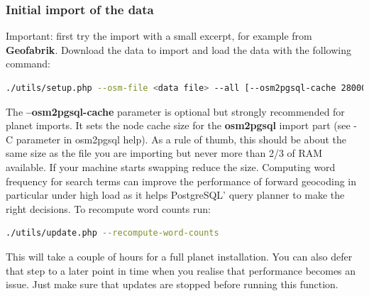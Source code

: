 \documentclass[12pt]{article}
\begin{document}
\subsubsection{Initial import of the data}
Important: first try the import with a small excerpt, for example from \textbf{Geofabrik}.
Download the data to import and load the data with the following command:
\begin{lstlisting}[language=bash,breaklines=true]
./utils/setup.php --osm-file <data file> --all [--osm2pgsql-cache 28000] 2>&1 | tee setup.log
\end{lstlisting}
The \textbf{--osm2pgsql-cache} parameter is optional but strongly recommended for planet imports. It
sets the node cache size for the \textbf{osm2pgsql} import part (see -C parameter in osm2pgsql help).
As a rule of thumb, this should be about the same size as the file you are importing but never
more than 2/3 of RAM available. If your machine starts swapping reduce the size.
Computing word frequency for search terms can improve the performance of forward geocoding
in particular under high load as it helps PostgreSQL' query planner to make the right decisions. To
recompute word counts run:
\begin{lstlisting}[language=bash,breaklines=true]
./utils/update.php --recompute-word-counts
\end{lstlisting}
This will take a couple of hours for a full planet installation. You can also defer that step to a
later point in time when you realise that performance becomes an issue. Just make sure that
updates are stopped before running this function.
\end{document}
